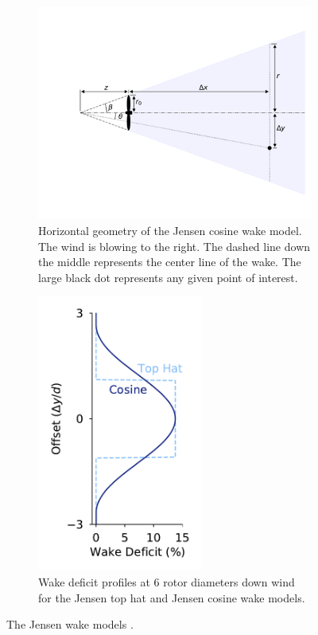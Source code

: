 \documentclass{jpconf}
\begin{document}
\begin{figure}[h!]
	\centering
	\begin{subfigure}[t]{0.6\textwidth}
		\centering
		\includegraphics[width=\textwidth, trim={3cm 0cm 0cm 0cm}, clip]{wake_model_visualizations/jensen_diagram}
		\caption{Horizontal geometry of the Jensen cosine wake model. The wind is blowing to the right. The dashed line down the middle represents the center line of the wake. The large black dot represents any given point of interest.}
		\label{fig:JensenDiagrams}
	\end{subfigure}\hspace{1pc}
	\begin{subfigure}[t]{0.35\textwidth}
		\centering
		\includegraphics[width=0.6\textwidth, trim={1.05cm 0cm 1.05cm 0cm}]{wake_model_visualizations/jensen_profiles}
		\caption{Wake deficit profiles at 6 rotor diameters down wind for the Jensen top hat and Jensen cosine wake models.}
		\label{fig:JensenProfiles}
	\end{subfigure}
	\caption{The Jensen wake models \cite{jensen1983}.}
\end{figure}
\end{document}
